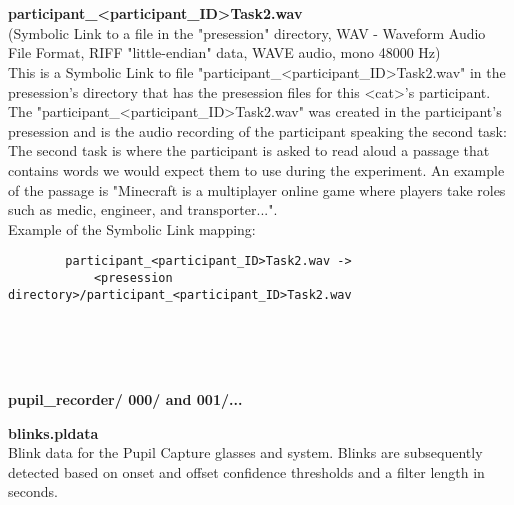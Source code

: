 \begin{description}
\begin{addmargin}[0em]{0em}
    \textbf{\\\\}
    \begin{addmargin}[1em]{0em} %
        \textbf{participant\_<participant\_ID>Task2.wav}\\
        (Symbolic Link to a file in the "presession" directory,
        WAV - Waveform Audio File Format, RIFF "little-endian" data, WAVE audio, mono 48000 Hz)\\
        This is a Symbolic Link to file "participant\_<participant\_ID>Task2.wav" in the presession's directory
        that has the presession files for this <cat>'s participant.\\
        The "participant\_<participant\_ID>Task2.wav" was created in the participant's presession and is the audio recording
        of the participant speaking the second task:\\
        The second task is where the participant is asked to read aloud a passage that contains words we would expect them
        to use during the experiment. An example of the passage is "Minecraft is a multiplayer online game where players
        take roles such as medic, engineer, and transporter...".\\ 
        Example of the Symbolic Link mapping:
        \begin{verbatim}
        participant_<participant_ID>Task2.wav ->
            <presession directory>/participant_<participant_ID>Task2.wav
        \end{verbatim}  
    \end{addmargin} %
\end{addmargin} %


\textbf{\\\\\\}
\begin{addmargin}[0em]{0em} %
    \textbf{pupil\_recorder/ 000/ and 001/... }

    \begin{addmargin}[1em]{0em} %
        \textbf{blinks.pldata}\\
        Blink data for the Pupil Capture glasses and system.
        Blinks are subsequently detected based on onset and offset confidence thresholds and a filter length in seconds.
    \end{addmargin} %


\end{addmargin}
\end{description}
